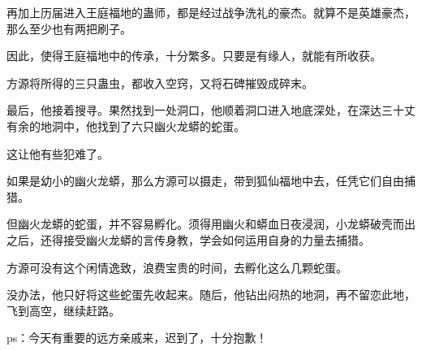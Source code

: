 \begin{this_body}
再加上历届进入王庭福地的蛊师，都是经过战争洗礼的豪杰。就算不是英雄豪杰，那么至少也有两把刷子。

因此，使得王庭福地中的传承，十分繁多。只要是有缘人，就能有所收获。

方源将所得的三只蛊虫，都收入空窍，又将石碑摧毁成碎末。

最后，他接着搜寻。果然找到一处洞口，他顺着洞口进入地底深处，在深达三十丈有余的地洞中，他找到了六只幽火龙蟒的蛇蛋。

这让他有些犯难了。

如果是幼小的幽火龙蟒，那么方源可以摄走，带到狐仙福地中去，任凭它们自由捕猎。

但幽火龙蟒的蛇蛋，并不容易孵化。须得用幽火和蟒血日夜浸润，小龙蟒破壳而出之后，还得接受幽火龙蟒的言传身教，学会如何运用自身的力量去捕猎。

方源可没有这个闲情逸致，浪费宝贵的时间，去孵化这么几颗蛇蛋。

没办法，他只好将这些蛇蛋先收起来。随后，他钻出闷热的地洞，再不留恋此地，飞到高空，继续赶路。

ps：今天有重要的远方亲戚来，迟到了，十分抱歉！

\end{this_body}

